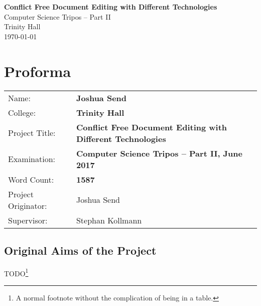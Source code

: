 \documentclass[12pt,a4paper,twoside,openright]{report}
\begin{document}


\pagestyle{empty}


\vspace*{60mm}
\begin{center}
\Huge
\textbf{Conflict Free Document Editing with Different Technologies} \\[5mm]
Computer Science Tripos -- Part II \\[5mm]
Trinity Hall \\[5mm]
\today  %
\end{center}


\pagestyle{plain}

\chapter*{Proforma}

{\large
\begin{tabular}{ll}
Name:               & \bf Joshua Send                       \\
College:            & \bf Trinity Hall                     \\
Project Title:      & \bf Conflict Free Document Editing with Different Technologies \\
Examination:        & \bf Computer Science Tripos -- Part II, June 2017  \\
Word Count:         & \bf 1587\footnotemark[1]			\\
Project Originator: & Joshua Send                    \\
Supervisor:         & Stephan Kollmann                    \\ 
\end{tabular}
}


\section*{Original Aims of the Project}


TODO\footnote{A normal footnote without the
complication of being in a table.} 
\end{document}
